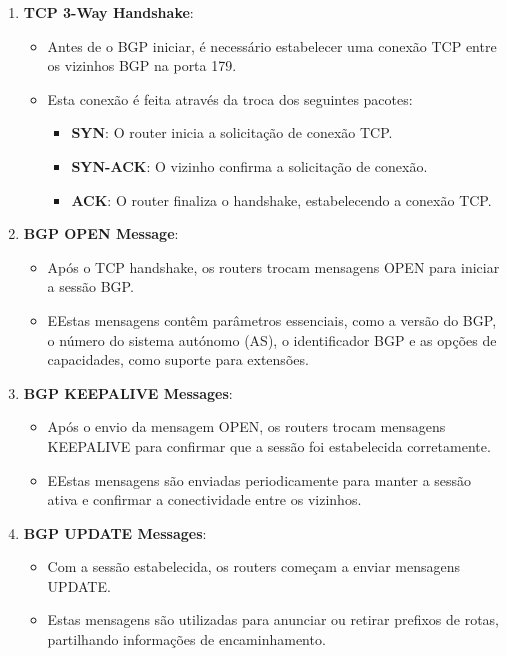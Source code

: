 \documentclass[11pt,english, openright, oneside]{book}
\begin{document}
\begin{enumerate}
  \begin{enumerate}
    \item \textbf{TCP 3-Way Handshake}:
    \begin{itemize}
      \item Antes de o BGP iniciar, é necessário estabelecer uma conexão TCP entre os vizinhos BGP na porta 179.
      \item Esta conexão é feita através da troca dos seguintes pacotes:
      \begin{itemize}
        \item \textbf{SYN}: O router inicia a solicitação de conexão TCP.
        \item \textbf{SYN-ACK}: O vizinho confirma a solicitação de conexão.
        \item \textbf{ACK}: O router finaliza o handshake, estabelecendo a conexão TCP.
      \end{itemize}
    \end{itemize}
    \item \textbf{BGP OPEN Message}:
    \begin{itemize}
      \item Após o TCP handshake, os routers trocam mensagens OPEN para iniciar a sessão BGP.
      \item EEstas mensagens contêm parâmetros essenciais, como a versão do BGP, o número do sistema autónomo (AS), o identificador BGP e as opções de capacidades, como suporte para extensões.
    \end{itemize}
    \item \textbf{BGP KEEPALIVE Messages}:
    \begin{itemize}
      \item Após o envio da mensagem OPEN, os routers trocam mensagens KEEPALIVE para confirmar que a sessão foi estabelecida corretamente.
      \item EEstas mensagens são enviadas periodicamente para manter a sessão ativa e confirmar a conectividade entre os vizinhos.
    \end{itemize}
    \item \textbf{BGP UPDATE Messages}:
    \begin{itemize}
      \item Com a sessão estabelecida, os routers começam a enviar mensagens UPDATE.
      \item Estas mensagens são utilizadas para anunciar ou retirar prefixos de rotas, partilhando informações de encaminhamento.
    \end{itemize}
  \end{enumerate}
  \vspace{0.2cm}


\end{enumerate}
\end{document}
